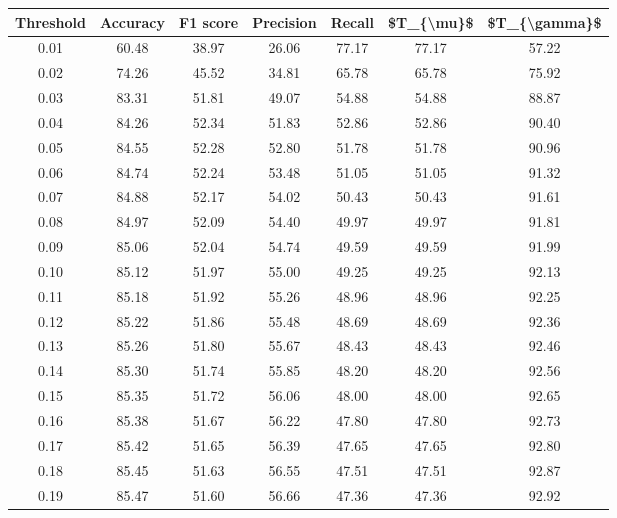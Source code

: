 \begin{tabular}{|c|c|c|c|c|c|c|}
\toprule
 Threshold &  Accuracy &  F1 score &  Precision &  Recall &  \$T\_\{\textbackslash mu\}\$ &  \$T\_\{\textbackslash gamma\}\$ \\
\hline
      0.01 &     60.48 &     38.97 &      26.06 &   77.17 &      77.17 &         57.22 \\
      0.02 &     74.26 &     45.52 &      34.81 &   65.78 &      65.78 &         75.92 \\
      0.03 &     83.31 &     51.81 &      49.07 &   54.88 &      54.88 &         88.87 \\
      0.04 &     84.26 &     52.34 &      51.83 &   52.86 &      52.86 &         90.40 \\
      0.05 &     84.55 &     52.28 &      52.80 &   51.78 &      51.78 &         90.96 \\
      0.06 &     84.74 &     52.24 &      53.48 &   51.05 &      51.05 &         91.32 \\
      0.07 &     84.88 &     52.17 &      54.02 &   50.43 &      50.43 &         91.61 \\
      0.08 &     84.97 &     52.09 &      54.40 &   49.97 &      49.97 &         91.81 \\
      0.09 &     85.06 &     52.04 &      54.74 &   49.59 &      49.59 &         91.99 \\
      0.10 &     85.12 &     51.97 &      55.00 &   49.25 &      49.25 &         92.13 \\
      0.11 &     85.18 &     51.92 &      55.26 &   48.96 &      48.96 &         92.25 \\
      0.12 &     85.22 &     51.86 &      55.48 &   48.69 &      48.69 &         92.36 \\
      0.13 &     85.26 &     51.80 &      55.67 &   48.43 &      48.43 &         92.46 \\
      0.14 &     85.30 &     51.74 &      55.85 &   48.20 &      48.20 &         92.56 \\
      0.15 &     85.35 &     51.72 &      56.06 &   48.00 &      48.00 &         92.65 \\
      0.16 &     85.38 &     51.67 &      56.22 &   47.80 &      47.80 &         92.73 \\
      0.17 &     85.42 &     51.65 &      56.39 &   47.65 &      47.65 &         92.80 \\
      0.18 &     85.45 &     51.63 &      56.55 &   47.51 &      47.51 &         92.87 \\
      0.19 &     85.47 &     51.60 &      56.66 &   47.36 &      47.36 &         92.92 \\

\end{tabular}
